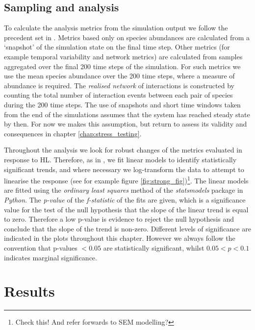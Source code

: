 \subsection{Sampling and analysis}
\label{sec:sampling}

To calculate the analysis metrics from the simulation output we follow the precedent set in \cite{lurgi2015effects}. Metrics based only on species abundances are calculated from a `snapshot' of the simulation state on the final time step. Other metrics (for example temporal variability and network metrics) are calculated from samples aggregated over the final 200 time steps of the simulation. For such metrics we use the mean species abundance over the 200 time steps, where a measure of abundance is required. The \emph{realised network} of interactions is constructed by counting the total number of interaction events between each pair of species during the 200 time steps. The use of snapshots and short time windows taken from the end of the simulations assumes that the system has reached steady state by then. For now we makes this assumption, but return to assess its validity and consequences in chapter \ref{chap:stress_testing}.

Throughout the analysis we look for robust changes of the metrics evaluated in response to HL. Therefore, as in \cite{lurgi2015effects}, we fit linear models to identify statistically significant trends, and where necessary we log-transform the data to attempt to linearise the response (see for example figure \ref{fig:strong_fig})\footnote{Check this! And refer forwards to SEM modelling?}. The linear models are fitted using the \emph{ordinary least squares} method of the \emph{statsmodels} package in \emph{Python}. The \emph{p-value} of the \emph{f-statistic} of the fits are given, which is a significance value for the test of the null hypothesis that the slope of the linear trend is equal to zero. Therefore a low p-value is evidence to reject the null hypothesis and conclude that the slope of the trend is non-zero. Different levels of significance are indicated in the plots throughout this chapter. However we always follow the convention that p-values $<0.05$ are statistically significant, whilst $0.05 < p < 0.1$ indicates marginal significance. 

\section{Results}
\label{sec:hir_results}

